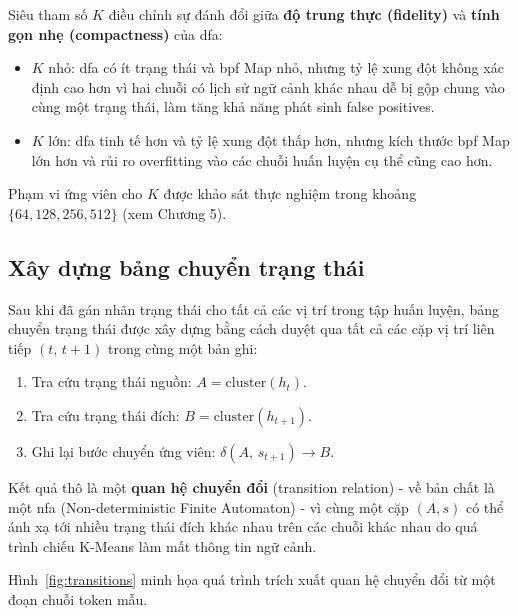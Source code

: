 \documentclass[../main.tex]{subfiles}
\begin{document}
Siêu tham số $K$ điều chỉnh sự đánh đổi giữa \textbf{độ trung thực
(fidelity)} và
\textbf{tính gọn nhẹ (compactness)} của \gls{dfa}:

\begin{itemize}
  \item $K$ nhỏ: \gls{dfa} có ít trạng thái và \gls{bpf} Map nhỏ, nhưng tỷ lệ
    xung đột không xác
    định cao hơn vì hai chuỗi có lịch sử ngữ cảnh khác nhau dễ bị gộp
    chung vào cùng
    một trạng thái, làm tăng khả năng phát sinh false positives.
  \item $K$ lớn: \gls{dfa} tinh tế hơn và tỷ lệ xung đột thấp hơn, nhưng
    kích thước \gls{bpf} Map
    lớn hơn và rủi ro overfitting vào các chuỗi huấn luyện cụ thể cũng cao hơn.
\end{itemize}

Phạm vi ứng viên cho $K$ được khảo sát thực nghiệm trong khoảng
$\{64, 128, 256, 512\}$
(xem Chương 5).

\subsection{Xây dựng bảng chuyển trạng thái}
\label{sec:transitions}

Sau khi đã gán nhãn trạng thái cho tất cả các vị trí trong tập huấn
luyện, bảng chuyển
trạng thái được xây dựng bằng cách duyệt qua tất cả các cặp vị trí
liên tiếp $(t,\, t+1)$
trong cùng một bản ghi:

\begin{enumerate}
  \item Tra cứu trạng thái nguồn: $A = \text{cluster}(h_t)$.
  \item Tra cứu trạng thái đích: $B = \text{cluster}(h_{t+1})$.
  \item Ghi lại bước chuyển ứng viên: $\delta(A,\, s_{t+1}) \to B$.
\end{enumerate}

Kết quả thô là một \textbf{quan hệ chuyển đổi} (transition relation)
- về bản chất là
một \gls{nfa} (Non-deterministic Finite Automaton) - vì cùng một cặp $(A,
s)$ có thể ánh xạ
tới nhiều trạng thái đích khác nhau trên các chuỗi khác nhau do quá
trình chiếu K-Means
làm mất thông tin ngữ cảnh.

Hình~\ref{fig:transitions} minh họa quá trình trích xuất quan hệ
chuyển đổi từ một
đoạn chuỗi token mẫu.
\end{document}
